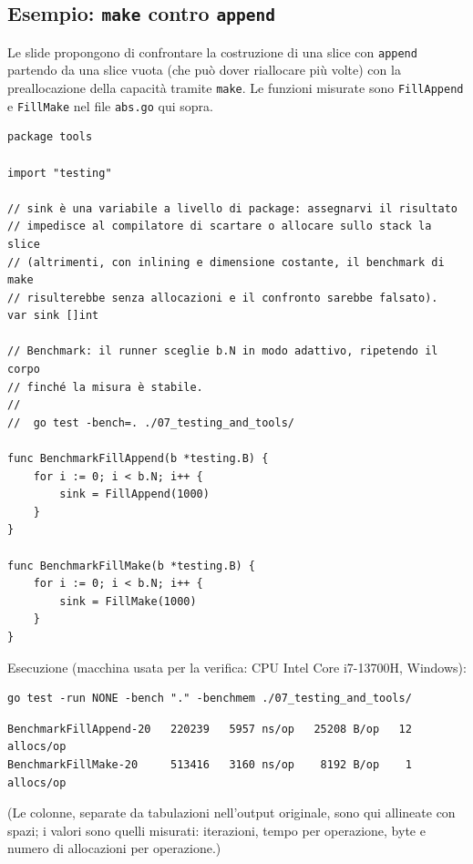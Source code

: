 \documentclass[11pt,a4paper]{report}
\newcommand{\cod}[1]{\texttt{#1}}
\begin{document}
\subsection{Esempio: \texttt{make} contro \texttt{append}}

Le slide propongono di confrontare la costruzione di una slice con \cod{append}
partendo da una slice vuota (che può dover riallocare più volte) con la
preallocazione della capacità tramite \cod{make}. Le funzioni misurate sono
\cod{FillAppend} e \cod{FillMake} nel file \texttt{abs.go} qui sopra.

\begin{lstlisting}[style=gocode,caption={\texttt{07\_testing\_and\_tools/benchmark\_test.go}}]
package tools

import "testing"

// sink è una variabile a livello di package: assegnarvi il risultato
// impedisce al compilatore di scartare o allocare sullo stack la slice
// (altrimenti, con inlining e dimensione costante, il benchmark di make
// risulterebbe senza allocazioni e il confronto sarebbe falsato).
var sink []int

// Benchmark: il runner sceglie b.N in modo adattivo, ripetendo il corpo
// finché la misura è stabile.
//
//	go test -bench=. ./07_testing_and_tools/

func BenchmarkFillAppend(b *testing.B) {
	for i := 0; i < b.N; i++ {
		sink = FillAppend(1000)
	}
}

func BenchmarkFillMake(b *testing.B) {
	for i := 0; i < b.N; i++ {
		sink = FillMake(1000)
	}
}
\end{lstlisting}

Esecuzione (macchina usata per la verifica: CPU Intel Core i7-13700H, Windows):

\begin{lstlisting}[style=shell]
go test -run NONE -bench "." -benchmem ./07_testing_and_tools/
\end{lstlisting}

\begin{lstlisting}[style=output,basicstyle=\ttfamily\footnotesize]
BenchmarkFillAppend-20   220239   5957 ns/op   25208 B/op   12 allocs/op
BenchmarkFillMake-20     513416   3160 ns/op    8192 B/op    1 allocs/op
\end{lstlisting}
(Le colonne, separate da tabulazioni nell'output originale, sono qui
allineate con spazi; i valori sono quelli misurati: iterazioni, tempo per
operazione, byte e numero di allocazioni per operazione.)
\end{document}
